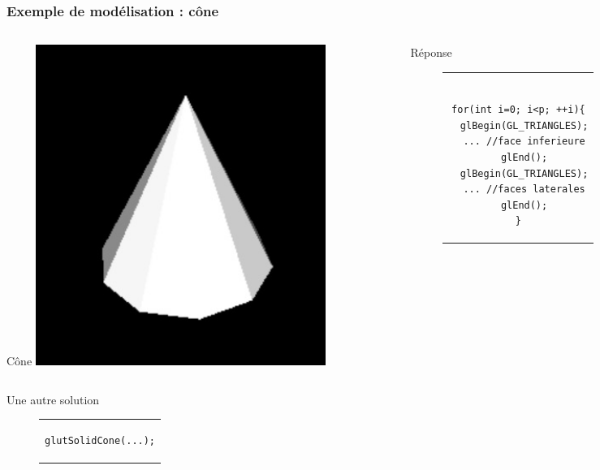 \documentclass{beamer}
\begin{document}
\begin{frame}[fragile]
\frametitle{Exemple de modélisation : cône}
	\begin{columns}[T]
		\begin{column}{0.45\textwidth}
			\begin{block}{Cône}
				\centering
				\includegraphics[width=0.75\textwidth]{img/cone}
			\end{block}
		\end{column}
		\pause
		\begin{column}{0.45\textwidth}
			\begin{exampleblock}{Réponse}
				\begin{figure}[h]
					\centering
					\begin{tabular}{c}
						\begin{lstlisting}[basicstyle=\small]

for(int i=0; i<p; ++i){
  glBegin(GL_TRIANGLES);
  ... //face inferieure
  glEnd();
  glBegin(GL_TRIANGLES);
  ... //faces laterales
  glEnd();
}
						\end{lstlisting}
					\end{tabular}
				\end{figure}	
			\end{exampleblock}	
		\end{column}
	\end{columns}
	\pause
	\begin{exampleblock}{Une autre solution}
		\begin{figure}[h]
			\centering
			\begin{tabular}{c}
				\begin{lstlisting}[basicstyle=\small]
glutSolidCone(...);
				\end{lstlisting}
			\end{tabular}
		\end{figure}
	\end{exampleblock}
\end{frame}
\end{document}
